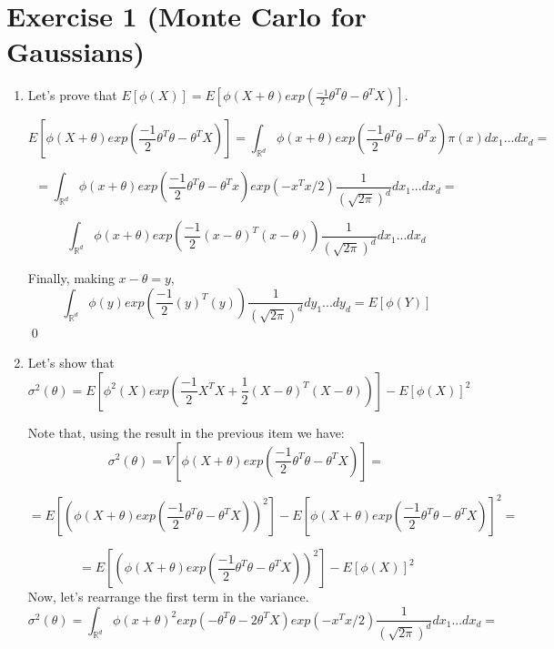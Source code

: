 \documentclass[12pt,letterpaper]{article}
\begin{document}

\section*{Exercise 1 (Monte Carlo for Gaussians)}
\begin{enumerate}[leftmargin=!,labelindent=5pt]
	\item Let's prove that $E[\phi(X)] = E[\phi(X+\theta)
	exp(\frac{-1}{2}\theta^T\theta - \theta^T X)]$.

	$$ E[\phi(X+\theta)exp(\frac{-1}{2}\theta^T\theta - \theta^T X)]
	= \int_{\mathbb{R}^d} \phi(x+\theta) exp(\frac{-1}{2}\theta^T
	\theta - \theta^T x)\pi(x)dx_1...dx_d = $$

	$$ =  \int_{\mathbb{R}^d} \phi(x+\theta) exp\left(\frac{-1}{2}
	\theta^T
	\theta - \theta^T x \right)exp(-x^T x / 2)\frac{1}{(\sqrt{2\pi})^d}
	dx_1...dx_d = $$

	$$ \int_{\mathbb{R}^d} \phi(x+\theta) exp\left(\frac{-1}{2}
	(x-\theta)^T(x-\theta)\right)\frac{1}{(\sqrt{2\pi})^d}
	dx_1...dx_d$$

	Finally, making $x-\theta = y$,
	$$ \int_{\mathbb{R}^d} \phi(y) exp\left(\frac{-1}{2}
	(y)^T(y)\right)\frac{1}{(\sqrt{2\pi})^d}
	dy_1...dy_d = E[\phi(Y)] $$
	\qed


	\item Let's show that
	$$ \sigma^2(\theta) = E\left[ 
	\phi^2(X) exp\left(
		\frac{-1}{2}X^T X + \frac{1}{2}(X - \theta)^T(X - \theta)
		\right)
	\right] - E[\phi(X)]^2$$

	Note that, using the result in the previous item we have:
	$$ \sigma^2(\theta) = V\left[
	\phi(X + \theta)exp\left(
		\frac{-1}{2}\theta^T \theta - \theta^T X
		\right)
	\right] = $$

	$$
	= E \left[ \left(
	\phi(X + \theta)exp\left(
		\frac{-1}{2}\theta^T \theta - \theta^T X
		\right) \right ) ^ 2
	\right] -
	E \left[
	\phi(X + \theta)exp\left(
		\frac{-1}{2}\theta^T \theta - \theta^T X
		\right)
	\right] ^2  = 
	$$

	$$
	= E \left[ \left(
	\phi(X + \theta)exp\left(
		\frac{-1}{2}\theta^T \theta - \theta^T X
		\right) \right ) ^ 2
	\right] -
	E \left[ \phi(X)
	\right] ^2
	$$
	Now, let's rearrange the first term in the variance.
	$$ \sigma^2(\theta) = 
	\int_{\mathbb{R}^d} \phi(x+\theta)^2 exp\left(
	 - \theta^T
	\theta - 2\theta^T X \right)exp(-x^T x / 2)\frac{1}{(\sqrt{2\pi})^d}
	dx_1...dx_d = $$


\end{enumerate}
\end{document}
